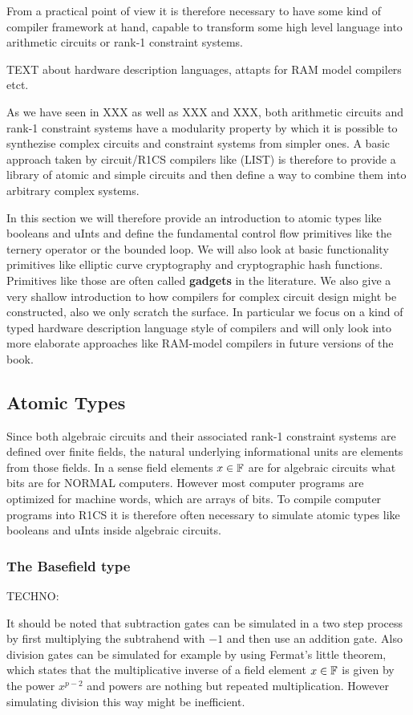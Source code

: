 From a practical point of view it is therefore necessary to have some kind of compiler framework at hand, capable to transform some high level language into arithmetic circuits or rank-1 constraint systems. 

TEXT about hardware description languages, attapts for RAM model compilers etct.

As we have seen in XXX as well as XXX and XXX, both arithmetic circuits and rank-1 constraint systems have a modularity property by which it is possible to synthezise  complex circuits and constraint systems from simpler ones. A basic approach taken by circuit/R1CS compilers like (LIST) is therefore to provide a library of atomic and simple circuits and then define a way to combine them into arbitrary complex systems. 

In this section we will therefore provide an introduction to atomic types like booleans and uInts and define the fundamental control flow primitives like the ternery operator or the bounded loop. We will also look at basic functionality primitives like elliptic curve cryptography and cryptographic hash functions. Primitives like those are often called \textbf{gadgets} in the literature. We also give a very shallow introduction to how compilers for complex circuit design might be constructed, also we only scratch the surface. In particular we focus on a kind of typed hardware description language style of compilers and will only look into more elaborate approaches like RAM-model compilers in future versions of the book.
\subsection{Atomic Types} 
Since both algebraic circuits and their associated rank-1 constraint systems are defined over finite fields, the natural underlying informational units are elements from those fields. In a sense field elements $x\in \mathbb{F}$ are for algebraic circuits what bits are for NORMAL computers. However most computer programs are optimized for machine words, which are arrays of bits. To compile computer programs into R1CS it is therefore often necessary to simulate atomic types like booleans and uInts inside algebraic circuits.
\subsubsection{The Basefield type} 
TECHNO:

It should be noted that subtraction gates can be simulated in a two step process by first multiplying the subtrahend with $-1$ and then use an addition gate. Also division gates can be simulated for example by using Fermat's little theorem, which states that the multiplicative inverse of a field element $x\in\mathbb{F}$ is given by the power $x^{p-2}$ and powers are nothing but repeated multiplication. However simulating division this way might be inefficient.


